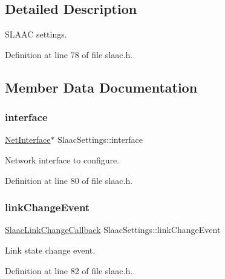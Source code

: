 \subsection{Detailed Description}
S\+L\+A\+AC settings. 

Definition at line 78 of file slaac.\+h.



\subsection{Member Data Documentation}
\mbox{\label{structSlaacSettings_a28e99b4d9e098adc42fb1d29e8137977}} 
\subsubsection{\texorpdfstring{interface}{interface}}
{\footnotesize\ttfamily \hyperlink{net_8h_a2234db8911a1148c9159979d8f5e0d6b}{Net\+Interface}$\ast$ Slaac\+Settings\+::interface}



Network interface to configure. 



Definition at line 80 of file slaac.\+h.

\mbox{\label{structSlaacSettings_a5fe65a555b650fac3bc027f55b99151f}} 
\subsubsection{\texorpdfstring{link\+Change\+Event}{linkChangeEvent}}
{\footnotesize\ttfamily \hyperlink{slaac_8h_a73319c956fa99974c25aa3a770a2004c}{Slaac\+Link\+Change\+Callback} Slaac\+Settings\+::link\+Change\+Event}



Link state change event. 



Definition at line 82 of file slaac.\+h.

\mbox{\label{structSlaacSettings_acf5b3baa56cbba942f4de3d80858c1c7}} 
